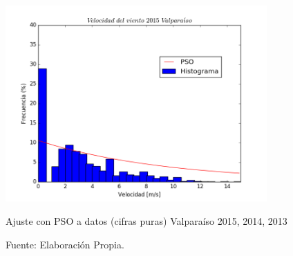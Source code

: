\begin{figure}[h!]
    \centering
    \includegraphics[height=75mm]{figures/result_2015_all_data.png}
    \caption{Ajuste con PSO a datos (cifras puras) Valparaíso 2015, 2014, 2013}
    \vspace{-.25cm}
    \caption*{Fuente: Elaboración Propia.}
    \label{fig:pso_valpo_15_oct_dic}
\end{figure}


